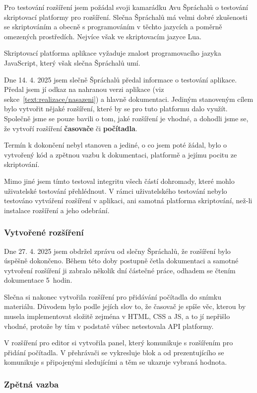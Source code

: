Pro testování rozšíření jsem požádal svoji kamarádku Avu Špráchalů o testování skriptovací platformy pro rozšíření.
Slečna Špráchalů má velmi dobré zkušenosti se skriptováním a obecně s programováním v těchto jazycích a poměrně omezených prostředích.
Nejvíce však ve skriptovacím jazyce Lua.

Skriptovací platforma aplikace vyžaduje znalost programovacího jazyka JavaScript, který však slečna Špráchalů umí.

Dne 14. 4. 2025 jsem slečně Špráchalů předal informace o testování aplikace.
Předal jsem jí odkaz na nahranou verzi aplikace (viz sekce~\ref{text:realizace/nasazeni}) a hlavně dokumentaci.
Jediným stanoveným cílem bylo vytvořit nějaké rozšíření, které by se pro tuto platformu dalo využít.
Společně jsme se pouze bavili o tom, jaké rozšíření je vhodné, a dohodli jsme se, že vytvoří rozšíření \textbf{časovače} či \textbf{počítadla}.

Termín k dokončení nebyl stanoven a jediné, o co jsem poté žádal, bylo o vytvořený kód a zpětnou vazbu k dokumentaci, platformě a jejímu pocitu ze skriptování.

Mimo jiné jsem tímto testoval integritu všech částí dohromady, které mohlo uživatelské testování přehlédnout.
V rámci uživatelského testování nebylo testováno vytváření rozšíření v aplikaci, ani samotná platforma skriptování, než-li instalace rozšíření a jeho odebrání.

\subsubsection{Vytvořené rozšíření}

Dne 27. 4. 2025 jsem obdržel zprávu od slečny Špráchalů, že rozšíření bylo úspěšně dokončeno.
Během této doby postupně četla dokumentaci a samotné vytvoření rozšíření ji zabralo několik dní částečné práce, odhadem se čtením dokumentace 5~hodin.

Slečna si nakonec vytvořila rozšíření pro přidávání počítadla do snímku materiálu.
Důvodem bylo podle jejích slov to, že časovač je spíše věc, kterou by musela implementovat složitě zejména v HTML, CSS a JS, a to jí nepřišlo vhodné, protože by tím v podstatě vůbec netestovala API platformy.

V rozšíření pro editor si vytvořila panel, který komunikuje s rozšířením pro přidání počítadla. V přehrávači se vykresluje blok a od prezentujícího se komunikuje s připojenými sledujícími a těm se ukazuje vybraná hodnota.

\subsubsection{Zpětná vazba}

